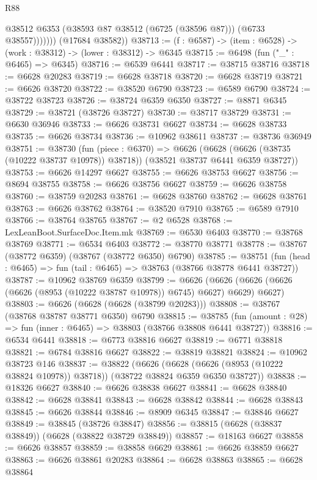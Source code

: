 \begin{lexlean}{R88}
\begin{coremodule}
                  @38512
                  @6353
                  (@38593 @87 @38512 (@6725 (@38596 @87)))
                  (@6733 @38557)))))))
      (@17684 @38582))
@38713 := (f : @6587) -> (item : @6528) -> (work : @38312) -> (lower : @38312) -> @6345
@38715 := @6498 (fun ("_" : @6465) => @6345)
@38716 := @6539 @6441
@38717 := @38715 @38716
@38718 := @6628 @20283
@38719 := @6628 @38718
@38720 := @6628 @38719
@38721 := @6626 @38720
@38722 := @38520 @6790
@38723 := @6589 @6790
@38724 := @38722 @38723
@38726 := @38724 @6359 @6350
@38727 := @8871 @6345
@38729 := @38721 (@38726 @38727)
@38730 := @38717 @38729
@38731 := @6630 @36946
@38733 := @6626 @38731 @6627
@38734 := @6628 @38733
@38735 := @6626 @38734
@38736 := @10962 @38611
@38737 := @38736 @36949
@38751 := @38730
    (fun (piece : @6370) =>
    @6626 (@6628 (@6626 (@38735 (@10222 @38737 @10978)) @38718)) (@38521 @38737 @6441 @6359 @38727))
@38753 := @6626 @14297 @6627
@38755 := @6626 @38753 @6627
@38756 := @8694 @38755
@38758 := @6626 @38756 @6627
@38759 := @6626 @38758
@38760 := @38759 @20283
@38761 := @6628 @38760
@38762 := @6628 @38761
@38763 := @6626 @38762
@38764 := @38520 @7910
@38765 := @6589 @7910
@38766 := @38764 @38765
@38767 := @2 @6528
@38768 := LexLeanBoot.SurfaceDoc.Item.mk
@38769 := @6530 @6403
@38770 := @38768 @38769
@38771 := @6534 @6403
@38772 := @38770 @38771
@38778 := @38767 (@38772 @6359) (@38767 (@38772 @6350) @6790)
@38785 := @38751 (fun (head : @6465) => fun (tail : @6465) => @38763 (@38766 @38778 @6441 @38727))
@38787 := @10962 @38769 @6359
@38799 := @6626
    (@6626 (@6626 (@6626 (@6626 (@8953 (@10222 @38787 @10978)) @6745) @6627) @6629) @6627)
@38803 := @6626 (@6628 (@6628 (@38799 @20283)))
@38808 := @38767 (@38768 @38787 @38771 @6350) @6790
@38815 := @38785 (fun (amount : @28) => fun (inner : @6465) => @38803 (@38766 @38808 @6441 @38727))
@38816 := @6534 @6441
@38818 := @6773 @38816 @6627
@38819 := @6771 @38818
@38821 := @6784 @38816 @6627
@38822 := @38819 @38821
@38824 := @10962 @38723 @146
@38837 := @38822
    (@6626 (@6628 (@6626 (@8953 (@10222 @38824 @10978)) @38718)) (@38722 @38824 @6359 @6350 @38727))
@38838 := @18326 @6627
@38840 := @6626 @38838 @6627
@38841 := @6628 @38840
@38842 := @6628 @38841
@38843 := @6628 @38842
@38844 := @6628 @38843
@38845 := @6626 @38844
@38846 := @8909 @6345
@38847 := @38846 @6627
@38849 := @38845 (@38726 @38847)
@38856 := @38815 (@6628 (@38837 @38849)) (@6628 (@38822 @38729 @38849))
@38857 := @18163 @6627
@38858 := @6626 @38857
@38859 := @38858 @6629
@38861 := @6626 @38859 @6627
@38863 := @6626 @38861 @20283
@38864 := @6628 @38863
@38865 := @6628 @38864

\end{coremodule}
\end{lexlean}
